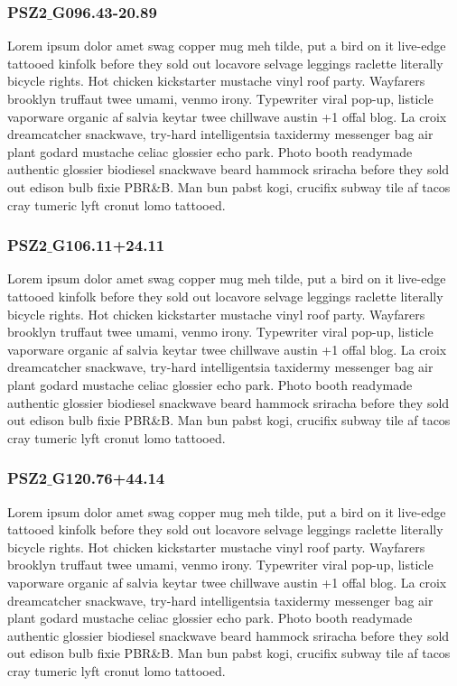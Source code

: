 \documentclass[apj, revtex4]{emulateapj}
\begin{document}
\subsubsection{PSZ2$\_$G096.43-20.89}

Lorem ipsum dolor amet swag copper mug meh tilde, put a bird on it live-edge tattooed kinfolk before they sold out locavore selvage leggings raclette literally bicycle rights. Hot chicken kickstarter mustache vinyl roof party. Wayfarers brooklyn truffaut twee umami, venmo irony. Typewriter viral pop-up, listicle vaporware organic af salvia keytar twee chillwave austin +1 offal blog. La croix dreamcatcher snackwave, try-hard intelligentsia taxidermy messenger bag air plant godard mustache celiac glossier echo park. Photo booth readymade authentic glossier biodiesel snackwave beard hammock sriracha before they sold out edison bulb fixie PBR\&B. Man bun pabst kogi, crucifix subway tile af tacos cray tumeric lyft cronut lomo tattooed.


\subsubsection{PSZ2$\_$G106.11+24.11}

Lorem ipsum dolor amet swag copper mug meh tilde, put a bird on it live-edge tattooed kinfolk before they sold out locavore selvage leggings raclette literally bicycle rights. Hot chicken kickstarter mustache vinyl roof party. Wayfarers brooklyn truffaut twee umami, venmo irony. Typewriter viral pop-up, listicle vaporware organic af salvia keytar twee chillwave austin +1 offal blog. La croix dreamcatcher snackwave, try-hard intelligentsia taxidermy messenger bag air plant godard mustache celiac glossier echo park. Photo booth readymade authentic glossier biodiesel snackwave beard hammock sriracha before they sold out edison bulb fixie PBR\&B. Man bun pabst kogi, crucifix subway tile af tacos cray tumeric lyft cronut lomo tattooed.


\subsubsection{PSZ2$\_$G120.76+44.14}

Lorem ipsum dolor amet swag copper mug meh tilde, put a bird on it live-edge tattooed kinfolk before they sold out locavore selvage leggings raclette literally bicycle rights. Hot chicken kickstarter mustache vinyl roof party. Wayfarers brooklyn truffaut twee umami, venmo irony. Typewriter viral pop-up, listicle vaporware organic af salvia keytar twee chillwave austin +1 offal blog. La croix dreamcatcher snackwave, try-hard intelligentsia taxidermy messenger bag air plant godard mustache celiac glossier echo park. Photo booth readymade authentic glossier biodiesel snackwave beard hammock sriracha before they sold out edison bulb fixie PBR\&B. Man bun pabst kogi, crucifix subway tile af tacos cray tumeric lyft cronut lomo tattooed.
\end{document}
